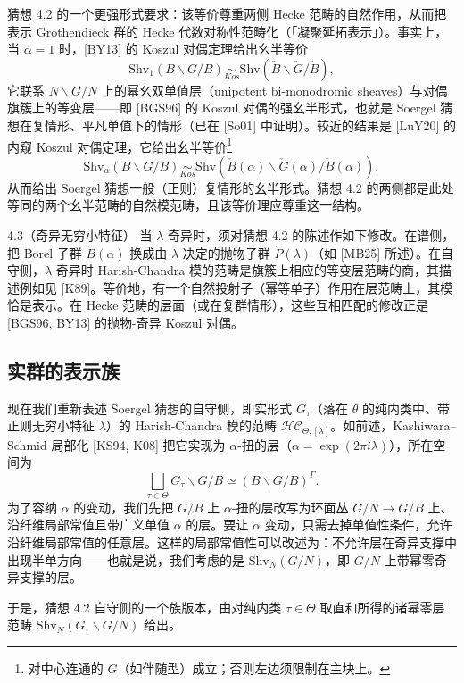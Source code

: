 猜想 4.2 的一个更强形式要求：该等价尊重两侧 Hecke 范畴的自然作用，从而把表示 Grothendieck 群的 Hecke 代数对称性范畴化（「凝聚延拓表示」）。事实上，当 $\alpha=1$ 时，[BY13] 的 Koszul 对偶定理给出幺半等价
\[
\mathrm{Shv}_1(B\backslash G/B)\underset{Kos}{\sim}\mathrm{Shv}(\check B\backslash\check G/\check B),
\]
它联系 $N\backslash G/N$ 上的幂幺双单值层（unipotent bi-monodromic sheaves）与对偶旗簇上的等变层——即 [BGS96] 的 Koszul 对偶的强幺半形式，也就是 Soergel 猜想在复情形、平凡单值下的情形（已在 [So01] 中证明）。较近的结果是 [LuY20] 的内窥 Koszul 对偶定理，它给出幺半等价\footnote{对中心连通的 $G$（如伴随型）成立；否则左边须限制在主块上。}
\[
\mathrm{Shv}_\alpha(B\backslash G/B)\underset{Kos}{\sim}\mathrm{Shv}(\check B(\alpha)\backslash\check G(\alpha)/\check B(\alpha)),
\]
从而给出 Soergel 猜想一般（正则）复情形的幺半形式。猜想 4.2 的两侧都是此处等同的两个幺半范畴的自然模范畴，且该等价理应尊重这一结构。

\begin{rem}{4.3}（奇异无穷小特征）\label{rem:a5-03-4-3}
当 $\lambda$ 奇异时，须对猜想 4.2 的陈述作如下修改。在谱侧，把 Borel 子群 $\check B(\alpha)$ 换成由 $\lambda$ 决定的抛物子群 $\check P(\lambda)$（如 [MB25] 所述）。在自守侧，$\lambda$ 奇异时 Harish-Chandra 模的范畴是旗簇上相应的等变层范畴的商，其描述例如见 [K89]。等价地，有一个自然投射子（幂等单子）作用在层范畴上，其模恰是表示。在 Hecke 范畴的层面（或在复群情形），这些互相匹配的修改正是 [BGS96, BY13] 的抛物-奇异 Koszul 对偶。
\end{rem}

\subsection{实群的表示族}

现在我们重新表述 Soergel 猜想的自守侧，即实形式 $G_\tau$（落在 $\theta$ 的纯内类中、带正则无穷小特征 $\lambda$）的 Harish-Chandra 模的范畴 $\mathcal{HC}_{\Theta,[\lambda]}$。如前述，Kashiwara--Schmid 局部化 [KS94, K08] 把它实现为 $\alpha$-扭的层（$\alpha=\exp(2\pi i\lambda)$），所在空间为
\[
\bigsqcup_{\tau\in\Theta}G_\tau\backslash G/B\simeq (B\backslash G/B)^\Gamma.
\]
为了容纳 $\alpha$ 的变动，我们先把 $G/B$ 上 $\alpha$-扭的层改写为环面丛 $G/N\to G/B$ 上、沿纤维局部常值且带广义单值 $\alpha$ 的层。要让 $\alpha$ 变动，只需去掉单值性条件，允许沿纤维局部常值的任意层。这样的局部常值性可以改述为：不允许层在奇异支撑中出现半单方向——也就是说，我们考虑的是 $\mathrm{Shv}_N(G/N)$，即 $G/N$ 上带幂零奇异支撑的层。

于是，猜想 4.2 自守侧的一个族版本，由对纯内类 $\tau\in\Theta$ 取直和所得的诸幂零层范畴 $\mathrm{Shv}_N(G_\tau\backslash G/N)$ 给出。

